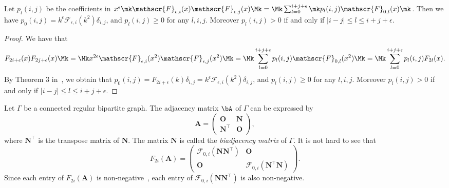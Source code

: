 \begin{lemm} \label{lem:coe}
Let $p_l(i,j)$ be the coefficients in 
$x^{\epsilon} \mk \mathscr{F}_{\epsilon,i}(x)\mathscr{F}_{\epsilon,j}(x)\Mk =\Mk \sum_{l=0}^{i+j+\epsilon}\mk p_l(i,j)
\mathscr{F}_{0,l}(x)\mk $. Then
we have 
$p_0(i,j)=
k^{\epsilon}\mathscr{F}_{\epsilon,i}(k^2)\delta_{i,j}$, and 
$p_l(i,j)\geq 0$ for any $l,i,j$. Moreover 
$p_l(i,j)>0$ if and only if $|i-j|\leq l \leq i+j+\epsilon$. 
\end{lemm}
\begin{proof}
We have that
\[
F_{2i+\epsilon}(x)F_{2j+\epsilon}(x)\Mk =\Mk 
x^{2\epsilon}\mathscr{F}_{\epsilon,i}(x^2)\mathscr{F}_{\epsilon,j}(x^2)
\Mk =\Mk 
\sum_{l=0}^{i+j+\epsilon}p_l(i,j)
\mathscr{F}_{0,l}(x^2)
\Mk =\Mk 
\sum_{l=0}^{i+j+\epsilon}p_l(i,j)F_{2l}(x).
\]
By Theorem 3 in~\cite{N}, we obtain that 
$p_0(i,j)=F_{2i+\epsilon}(k) \delta_{i,j}=
k^{\epsilon}\mathscr{F}_{\epsilon,i}(k^2)\delta_{i,j}$, and 
$p_l(i,j)\geq 0$ for any $l,i,j$. Moreover 
$p_l(i,j)>0$ if and only if $|i-j|\leq l \leq i+j+\epsilon$. 
\end{proof}
Let $\Gamma$ be a connected regular bipartite graph. 
The adjacency matrix $\bA$ of $\Gamma$ can be expressed by 
\[
\boldsymbol{A}=
\begin{pmatrix}
\boldsymbol{O} & \boldsymbol{N}\\
\boldsymbol{N}^{\top} & \boldsymbol{O} 
\end{pmatrix}, 
\]
where $\boldsymbol{N}^{\top}$ is the transpose matrix of $\boldsymbol{N}$. 
The matrix $\boldsymbol{N}$ is called the \emph{biadjacency matrix} of $\Gamma$. 
It is not hard to see that 
\begin{equation} \label{eq:AB}
F_{2i}(\boldsymbol{A})= 
\begin{pmatrix}
\mathscr{F}_{0,i}(\boldsymbol{N}\boldsymbol{N}^{\top}) & \boldsymbol{O} \\
\boldsymbol{O} & \mathscr{F}_{0,i}(\boldsymbol{N}^{\top} \boldsymbol{N})
\end{pmatrix}. 
\end{equation}
Since each entry of $F_{2i}(\boldsymbol{A})$ is non-negative~\cite{S66}, 
each entry of $\mathscr{F}_{0,i}(\boldsymbol{N}\boldsymbol{N}^{\top})$ is also non-negative. 


